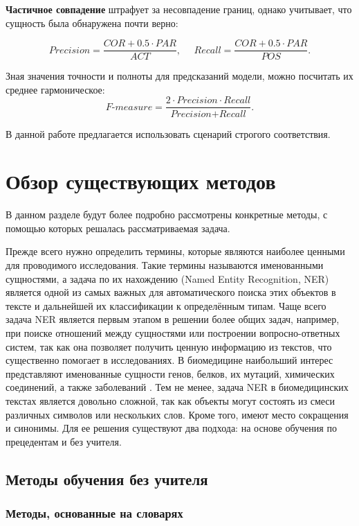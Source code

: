 \documentclass[12pt, a4paper]{article} %
\begin{document}
\textbf{Частичное совпадение} штрафует за несовпадение границ, однако учитывает, что сущность была обнаружена почти верно:

$$\textit{Precision}=\frac{\textit{COR}+0.5\cdot\textit{PAR}}{\textit{ACT}}, ~~~~~~ \textit{Recall}=\frac{\textit{COR}+0.5\cdot\textit{PAR}}{\textit{POS}}.$$

Зная значения точности и полноты для предсказаний модели, можно посчитать их среднее гармоническое:
$$\textit{F-measure}=\frac{2\cdot\textit{Precision}\cdot\textit{Recall}}{\textit{Precision}+\textit{Recall}}.$$

В данной работе предлагается использовать сценарий строгого соответствия.	




\newpage
\section{Обзор существующих методов}
В данном разделе будут более подробно рассмотрены конкретные методы, с помощью которых решалась рассматриваемая задача. 

Прежде всего нужно определить термины, которые являются наиболее ценными для проводимого исследования. Такие термины называются именованными сущностями, а задача по их нахождению (Named Entity Recognition, NER) является одной из самых важных для автоматического поиска этих объектов в тексте и дальнейшей их классификации к определённым типам. Чаще всего задача NER является первым этапом в решении более общих задач, например, при поиске отношений между сущностями или построении вопросно-ответных систем, так как она позволяет получить ценную информацию из текстов, что существенно помогает в исследованиях. В биомедицине наибольший интерес представляют именованные сущности генов, белков, их мутаций, химических соединений, а также заболеваний \cite{Zhu2018}. Тем не менее, задача NER в биомедицинских текстах является довольно сложной, так как объекты могут состоять из смеси различных символов или нескольких слов. Кроме того, имеют место сокращения и синонимы. Для ее решения существуют два подхода: на основе обучения по прецедентам и без учителя. 

\subsection{Методы обучения без учителя}
\subsubsection{Методы, основанные на словарях}
\end{document}
